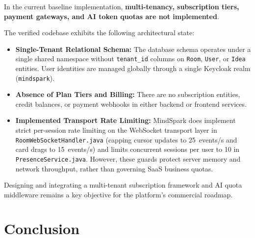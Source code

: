 In the current baseline implementation, \textbf{multi-tenancy, subscription tiers, payment gateways, and AI token quotas are not implemented}.

The verified codebase exhibits the following architectural state:
\begin{itemize}
    \item \textbf{Single-Tenant Relational Schema:} The database schema operates under a single shared namespace without \texttt{tenant\_id} columns on \texttt{Room}, \texttt{User}, or \texttt{Idea} entities. User identities are managed globally through a single Keycloak realm (\texttt{mindspark}).
    \item \textbf{Absence of Plan Tiers and Billing:} There are no subscription entities, credit balances, or payment webhooks in either backend or frontend services.
    \item \textbf{Implemented Transport Rate Limiting:} MindSpark does implement strict per-session rate limiting on the WebSocket transport layer in \texttt{RoomWebSocketHandler.java} (capping cursor updates to 25~events/s and card drags to 15~events/s) and limits concurrent sessions per user to 10 in \texttt{PresenceService.java}. However, these guards protect server memory and network throughput, rather than governing SaaS business quotas.
\end{itemize}
Designing and integrating a multi-tenant subscription framework and AI quota middleware remains a key objective for the platform's commercial roadmap.


\section{Conclusion}
\label{sec:conclusion}

